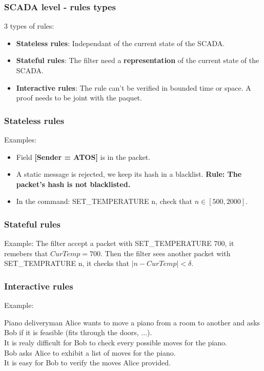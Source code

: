 \documentclass{beamer}
\begin{document}
\begin{frame}
    \frametitle{SCADA level - rules types}
    
    3 types of rules:
    \vfill
    \begin{itemize}
    	\item {\bf Stateless rules}: Independant of the current state of the SCADA.
    	\vfill
    	\item {\bf Stateful rules}: The filter need a {\bf representation} of the current state of the SCADA.
    	\vfill
    	\item {\bf Interactive rules}: The rule can't be verified in bounded time or space. A proof needs to be joint with the paquet.
    \end{itemize}
\end{frame}

\begin{frame}
    \frametitle{Stateless rules}
    
    Examples:
    \vfill
    \begin{itemize}
    	\item Field {\bf [Sender = ATOS]} is in the packet.
    	\vfill
    	\item A static message is rejected, we keep its hash in a blacklist. {\bf Rule: The packet's hash is not blacklisted.}
    	\vfill
    	\item In the command: SET\_TEMPERATURE n, check that $n \in [500, 2000]$.
    \end{itemize}
\end{frame}

\begin{frame}
    \frametitle{Stateful rules}
    
    Example:
    \vfill
    The filter accept a packet with SET\_TEMPERATURE 700, it remebers that $CurTemp = 700$.
    \vfill
    Then the filter sees another packet with SET\_TEMPRATURE n, it checks that $|n-CurTemp| < \delta$.
\end{frame}

\begin{frame}
    \frametitle{Interactive rules}
    
    Example:
    \vfill
    \begin{block}{Piano deliveryman}
    	Alice wants to move a piano from a room to another and asks Bob if it is feasible (fits through the doors, ...).\\
    	It is realy difficult for Bob to check every possible moves for the piano.\\
    	Bob asks Alice to exhibit a list of moves for the piano.\\
    	It is easy for Bob to verify the moves Alice provided.
    \end{block}
\end{frame}
\end{document}
